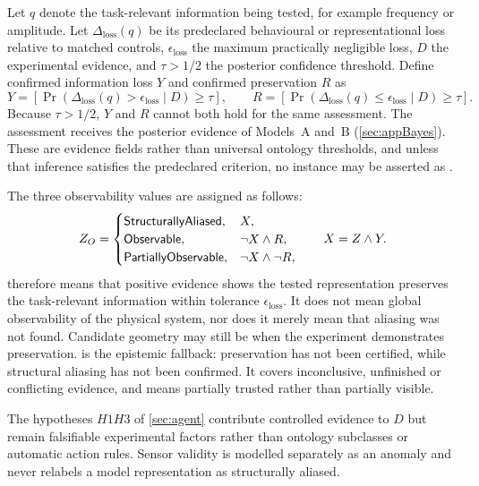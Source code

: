 Let $q$ denote the task-relevant information being tested, for example frequency or amplitude. Let $\Delta_{\mathrm{loss}}(q)$ be its predeclared behavioural or representational loss relative to matched controls, $\epsilon_{\mathrm{loss}}$ the maximum practically negligible loss, $D$ the experimental evidence, and $\tau>1/2$ the posterior confidence threshold. Define confirmed information loss $Y$ and confirmed preservation $R$ as
\begin{equation}
Y=\left[\Pr\!\left(\Delta_{\mathrm{loss}}(q)>\epsilon_{\mathrm{loss}}\mid D\right)\geq\tau\right],
\qquad
R=\left[\Pr\!\left(\Delta_{\mathrm{loss}}(q)\leq\epsilon_{\mathrm{loss}}\mid D\right)\geq\tau\right].
\label{eq:bayesian-evidence}
\end{equation}
Because $\tau>1/2$, $Y$ and $R$ cannot both hold for the same assessment. The assessment receives the posterior evidence of Models~A and~B (\autoref{sec:appBayes}). These are evidence fields rather than universal ontology thresholds, and unless that inference satisfies the predeclared criterion, no instance may be asserted as .

The three observability values are assigned as follows:
\begin{equation*}
Z_O=
\begin{cases}
\textsf{StructurallyAliased}, & X,\\
\textsf{Observable}, & \neg X\wedge R,\\
\textsf{PartiallyObservable}, & \neg X\wedge\neg R,
\end{cases}
\qquad X=Z\wedge Y.
\end{equation*}
 therefore means that positive evidence shows the tested representation preserves the task-relevant information within tolerance $\epsilon_{\mathrm{loss}}$. It does not mean global observability of the physical system, nor does it merely mean that aliasing was not found. Candidate geometry may still be  when the experiment demonstrates preservation\@.  is the epistemic fallback: preservation has not been certified, while structural aliasing has not been confirmed. It covers inconclusive, unfinished or conflicting evidence, and means partially trusted rather than partially visible.

The hypotheses $H1$\textendash{}$H3$ of \autoref{sec:agent} contribute controlled evidence to $D$ but remain falsifiable experimental factors rather than ontology subclasses or automatic action rules. Sensor validity is modelled separately as an anomaly and never relabels a model representation as structurally aliased.

